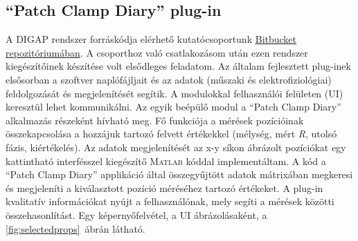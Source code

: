 \documentclass[12pt,a4paper]{report}
\begin{document}
\subsection*{\enquote{Patch Clamp Diary} plug-in}
A DIGAP rendszer forráskódja elérhető kutatócsoportunk \href{https://bitbucket.org/biomag/autopatcher}{\textsf{Bitbucket} repozitóriumában}. A csoporthoz való csatlakozásom után ezen rendszer kiegészítőinek készítése volt elsődleges feladatom. Az általam fejlesztett plug-inek elsősorban a szoftver naplófájljait és az adatok (műszaki és elektrofiziológiai) feldolgozását és megjelenítését segítik. A modulokkal felhasználói felületen (UI) keresztül lehet kommunikálni. Az egyik beépülő modul a \enquote{Patch Clamp Diary} alkalmazás részeként hívható meg. Fő funkciója a mérések pozícióinak összekapcsolása a hozzájuk tartozó felvett értékekkel (mélység, mért \textit{R}, utolsó fázis, kiértékelés). Az adatok megjelenítését az x-y síkon ábrázolt pozíciókat egy kattintható interfésszel kiegészítő \textsc{Matlab} kóddal implementáltam. A kód a \enquote{Patch Clamp Diary} applikáció által összegyűjtött adatok mátrixában megkeresi és megjeleníti a kiválasztott pozíció méréséhez tartozó értékeket. A plug-in kvalitatív információkat nyújt a felhasználónak, mely segíti a mérések közötti összehasonlítást. Egy képernyőfelvétel, a UI ábrázolásaként, a \ref{fig:selectedprops}~ábrán látható.
\end{document}
